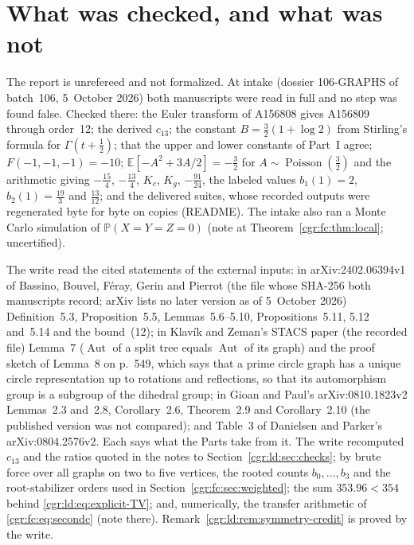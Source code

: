 \documentclass[11pt,letterpaper]{article}
\numberwithin{equation}{section}
\theoremstyle{definition}\newtheorem{definition}[theorem]{Definition}
\theoremstyle{remark}\newtheorem{remark}[theorem]{Remark}
\newcommand{\PP}{\mathbb P}
\newcommand{\EE}{\mathbb E}
\DeclareMathOperator{\Aut}{Aut}
\DeclareMathOperator{\Poi}{Poisson}
\begin{document}
\section*{What was checked, and what was not}\label{cgr:sec:trust}
The report is unrefereed and not formalized. At intake (dossier 106-GRAPHS of batch~106, 5~October 2026) both manuscripts were read in full and no step was found false. Checked there: the Euler transform of A156808 gives A156809 through order~12; the derived $c_{13}$; the constant $B=\frac32(1+\log2)$ from Stirling's formula for $\Gamma(t+\frac12)$; that the upper and lower constants of Part~I agree; $F(-1,-1,-1)=-10$; $\EE[-A^2+3A/2]=-\frac32$ for $A\sim\Poi(\frac32)$ and the arithmetic giving $-\frac{15}4$, $-\frac{13}4$, $K_c$, $K_g$, $-\frac{91}{24}$, the labeled values $b_1(1)=2$, $b_2(1)=\frac{19}3$ and $\frac{13}{12}$; and the delivered suites, whose recorded outputs were regenerated byte for byte on copies (README). The intake also ran a Monte Carlo simulation of $\PP(X=Y=Z=0)$ (note at Theorem~\ref{cgr:fc:thm:local}; uncertified).

The write read the cited statements of the external inputs: in arXiv:2402.06394v1 of Bassino, Bouvel, F\'eray, Gerin and Pierrot (the file whose SHA-256 both manuscripts record; arXiv lists no later version as of 5~October 2026) Definition~5.3, Proposition~5.5, Lemmas~5.6--5.10, Propositions~5.11, 5.12 and~5.14 and the bound~(12); in Klav\'ik and Zeman's STACS paper (the recorded file) Lemma~7 ($\Aut$ of a split tree equals $\Aut$ of its graph) and the proof sketch of Lemma~8 on p.~549, which says that a prime circle graph has a unique circle representation up to rotations and reflections, so that its automorphism group is a subgroup of the dihedral group; in Gioan and Paul's arXiv:0810.1823v2 Lemmas~2.3 and~2.8, Corollary~2.6, Theorem~2.9 and Corollary~2.10 (the published version was not compared); and Table~3 of Danielsen and Parker's arXiv:0804.2576v2. Each says what the Parts take from it. The write recomputed $c_{13}$ and the ratios quoted in the notes to Section~\ref{cgr:ld:sec:checks}; by brute force over all graphs on two to five vertices, the rooted counts $b_0,\ldots,b_3$ and the root-stabilizer orders used in Section~\ref{cgr:fc:sec:weighted}; the sum $353.96<354$ behind \eqref{cgr:ld:eq:explicit-TV}; and, numerically, the transfer arithmetic of \eqref{cgr:fc:eq:secondc} (note there). Remark~\ref{cgr:ld:rem:symmetry-credit} is proved by the write.
\end{document}
